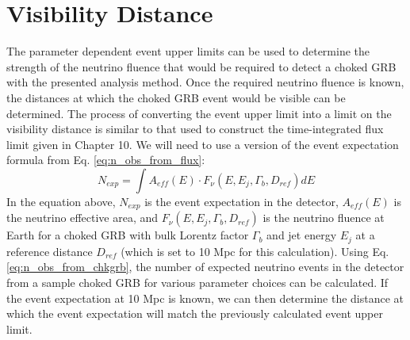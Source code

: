 \documentclass{gatech-thesis}
\begin{document}
\section{Visibility Distance}
The parameter dependent event upper limits can be used to determine the strength of the neutrino fluence that would be required to detect a choked GRB with the presented analysis method. Once the required neutrino fluence is known, the distances at which the choked GRB event would be visible can be determined. The process of converting the event upper limit into a limit on the visibility distance is similar to that used to construct the time-integrated flux limit given in Chapter 10. We will need to use a version of the event expectation formula from Eq. \ref{eq:n_obs_from_flux}:
\begin{equation}\label{eq:n_obs_from_chkgrb}
N_{exp} = \int A_{eff}(E) \cdot F_{\nu}(E, E_j, \Gamma_b, D_{ref})dE
\end{equation}
In the equation above, $N_{exp}$ is the event expectation in the detector, $A_{eff}(E)$ is the neutrino effective area, and $F_{\nu}(E, E_j, \Gamma_b, D_{ref})$ is the neutrino fluence at Earth for a choked GRB with bulk Lorentz factor $\Gamma_b$ and jet energy $E_j$ at a reference distance $D_{ref}$ (which is set to 10 Mpc for this calculation). Using Eq. \ref{eq:n_obs_from_chkgrb}, the number of expected neutrino events in the detector from a sample choked GRB for various parameter choices can be calculated. If the event expectation at 10 Mpc is known, we can then determine the distance at which the event expectation will match the previously calculated event upper limit.
\end{document}
